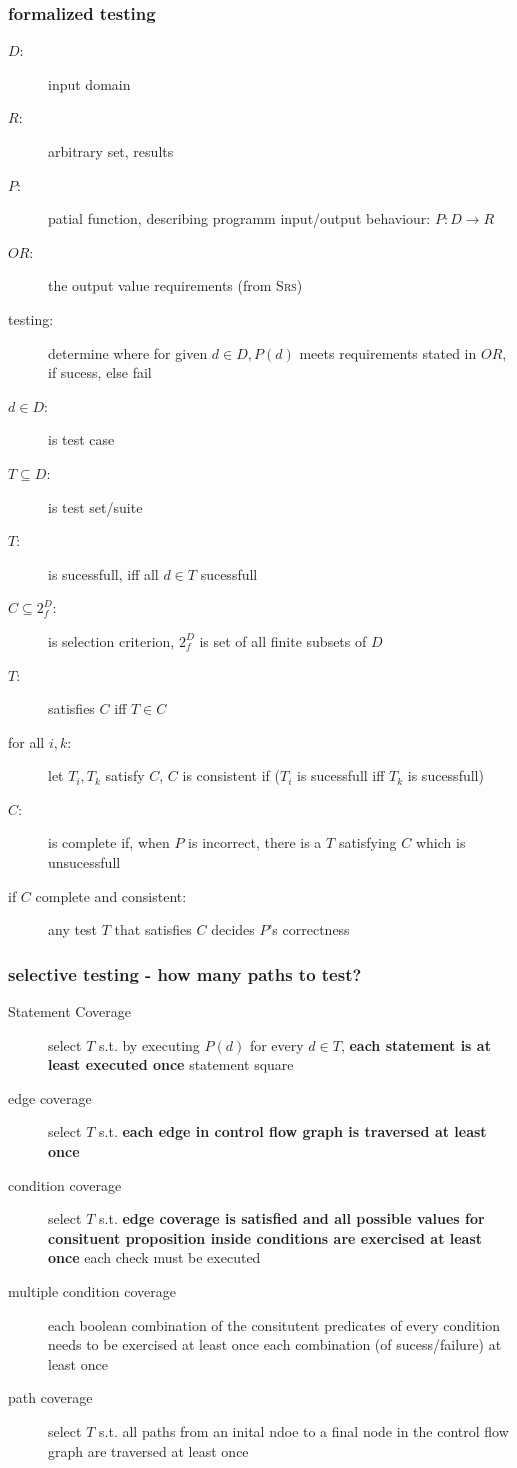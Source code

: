 \documentclass[a4paper, 10pt]{article}
\begin{document}
\subsubsection{formalized testing}
\begin{description}
	\item[$D$:] input domain
	\item[$R$:] arbitrary set, results
	\item[$P$:] patial function, describing programm input/output behaviour: $P:D\to R$
	\item[$OR$:] the output value requirements (from \textsc{Srs})
	\item[testing:]determine where for given $d\in D,P(d)$ meets requirements stated in $OR$, if \follows sucess, else fail
	\item[$d\in D$:] is test case
	\item[$T\subseteq D$:] is test set/suite
	\item[$T$:] is sucessfull, iff all $d\in T$ sucessfull
	\item[$C\subseteq 2^D_f$:]  is selection criterion, $2^D_f$ is set of all finite subsets of $D$
	\item[$T$:] satisfies $C$ iff $T\in C$
	\item[for all $i,k$:] let $T_i,T_k$ satisfy $C$, $C$ is consistent if ($T_i$ is sucessfull iff $T_k$ is sucessfull)
	\item[$C$:] is complete if, when $P$ is incorrect, there is a $T$ satisfying $C$ which is unsucessfull
	\item[if $C$ complete and consistent:] any test $T$ that satisfies $C$ decides $P$'s correctness
\end{description}

\subsubsection{selective testing - how many paths to test?}
\begin{description}
	\item[Statement Coverage] select $T$ s.t. by executing $P(d)$ for every $d\in T$, \textbf{each statement is at least executed once} {\tiny statement \follows square}
	\item[edge coverage] select $T$ s.t. \textbf{each edge in control flow graph is traversed at least once}
	\item[condition coverage] select $T$ s.t. \textbf{edge coverage is satisfied and all possible values for consituent proposition inside conditions are exercised at least once} {\tiny each check must be executed}
	\item[multiple condition coverage] each boolean combination of the consitutent predicates of every condition needs to be exercised at least once {\tiny each combination (of sucess/failure) at least once}
	\item[path coverage] select $T$ s.t. all paths from an inital ndoe to a final node in the control flow graph are traversed at least once
\end{description}
\end{document}
